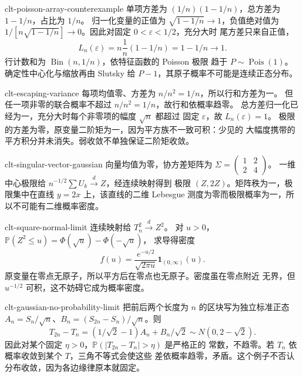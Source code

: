 \begin{solution}{clt-poisson-array-counterexample}
单项方差为 $(1/n)(1-1/n)$，总方差为 $1-1/n$，占比为 $1/n$。
归一化变量的正值为 $\sqrt{1-1/n}\to1$，负值绝对值为
$1/[n\sqrt{1-1/n}]\to0$。因此对固定 $0<\varepsilon<1/2$，充分大时
尾方差只来自正值，
\[
 L_n(\varepsilon)
 =n\frac1n(1-1/n)=1-1/n\longrightarrow1.
\]
行计数和为 $\operatorname{Bin}(n,1/n)$，依特征函数的 Poisson 极限
趋于 $P\sim\operatorname{Pois}(1)$。确定性中心化与缩放再由 Slutsky 给
$P-1$，其原子概率不可能是连续正态分布。
\end{solution}

\begin{solution}{clt-escaping-variance}
每项均值零、方差为 $n/n^2=1/n$，所以行和方差为一。
但任一项非零的联合概率不超过 $n/n^2=1/n$，故行和依概率趋零。
总方差归一化已经为一，充分大时每个非零项的幅度 $\sqrt n$ 都超过
固定 $\varepsilon$，故 $L_n(\varepsilon)=1$。
极限的方差为零，原变量二阶矩为一，因为平方族不一致可积：少见的
大幅度携带的平方积分并未消失。弱收敛不单独保证二阶矩收敛。
\end{solution}

\begin{solution}{clt-singular-vector-gaussian}
向量均值为零，协方差矩阵为
$\Sigma=\begin{pmatrix}1&2\\2&4\end{pmatrix}$。
一维中心极限给 $n^{-1/2}\sum U_k\xrightarrow dZ$，经连续映射得到
极限 $(Z,2Z)$。矩阵秩为一，极限集中在直线 $y=2x$ 上，该直线的二维
Lebesgue 测度为零而极限概率为一，所以不可能有二维概率密度。
\end{solution}

\begin{solution}{clt-square-normal-limit}
连续映射给 $T_n^2\xrightarrow dZ^2$。
对 $u>0$，$\mathbb P(Z^2\le u)=\Phi(\sqrt u)-\Phi(-\sqrt u)$，
求导得密度
\[
 f(u)=\frac{e^{-u/2}}{\sqrt{2\pi u}}\mathbf1_{(0,\infty)}(u).
\]
原变量在零点无原子，所以平方后在零点也无原子。密度虽在零点附近
无界，但 $u^{-1/2}$ 可积，这不妨碍它成为概率密度。
\end{solution}

\begin{solution}{clt-gaussian-no-probability-limit}
把前后两个长度为 $n$ 的区块写为独立标准正态
$A_n=S_n/\sqrt n$、$B_n=(S_{2n}-S_n)/\sqrt n$。则
\[
 T_{2n}-T_n=(1/\sqrt2-1)A_n+B_n/\sqrt2
       \sim N(0,2-\sqrt2).
\]
因此对某个固定 $\eta>0$，$\mathbb P(|T_{2n}-T_n|>\eta)$ 是严格正的
常数，不趋零。若 $T_n$ 依概率收敛到某个 $T$，三角不等式会使这些
差依概率趋零，矛盾。这个例子不否认分布收敛，因为各边缘律原本就固定。
\end{solution}

